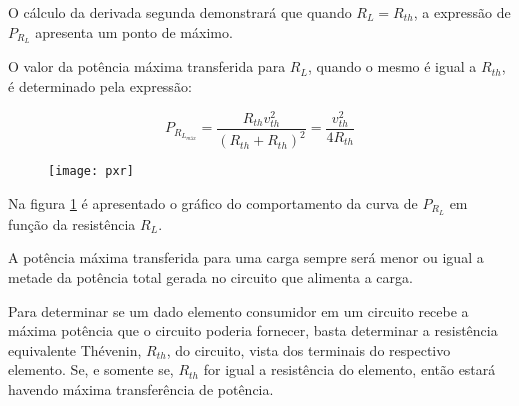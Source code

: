 \documentclass[12pt,fleqn]{book} %
\begin{document}
{O cálculo da derivada segunda demonstrará que quando $R_L=R_{th}$, a expressão de $P_{R_L}$ apresenta um ponto de máximo.

O valor da potência máxima transferida para $R_L$, quando o mesmo é igual a $R_{th}$, é determinado pela expressão:

\begin{equation}
P_{R_{L_{máx}}}=\frac{R_{th} v_{th}^2}{(R_{th}+R_{th})^2} =\frac{v_{th}^2}{4R_{th}}
\end{equation}

\begin{figure}[!htbp] \centering\texttt{[image: pxr]}
            \caption{}\label{pxr} 
        \end{figure}

Na figura \ref{pxr} é apresentado o gráfico do comportamento da curva de $P_{R_L}$ em função da resistência $R_L$.

\begin{remark}

A potência máxima transferida para uma carga sempre será menor ou igual a metade da potência total gerada no circuito que alimenta a carga.

\end{remark}

\begin{remark}

Para determinar se um dado elemento consumidor em um circuito recebe a máxima potência que o circuito poderia fornecer, basta determinar a resistência equivalente Thévenin, $R_{th}$, do circuito, vista dos terminais do respectivo elemento. Se, e somente se,  $R_{th}$ for igual a resistência do elemento, então estará havendo máxima transferência de potência.

\end{remark}

    }
    
\end{document}

